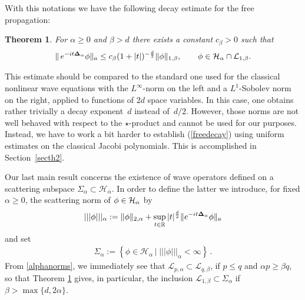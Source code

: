 \documentclass[11pt]{article}
\newtheorem{theorem}{Theorem}
\begin{document}
With this notations we have the following decay estimate for the free
propagation:
\begin{theorem}\label{th2} For $\alpha\geq 0$ and  $\beta > d$ there exists a constant
$c_\beta>0$ such that
\begin{gather}\label{freedecay}
\Vert\, e^{-it{\bf\Delta}_\alpha}\phi \Vert_a  \leq  c_{\beta}(1+
|t|)^{-\frac{d}{2}} \Vert\phi\Vert_{1,\beta} ,
\qquad \phi\in {\cal H}_\alpha\cap {\cal L}_{1,\beta} .
\end{gather}
\end{theorem}

This estimate should be compared to the standard one used for the
classical nonlinear wave equations with the $L^\infty$-norm on the
left and a $L^1$-Sobolev norm on the right, applied to
functions of $2d$ space variables. In this case, one obtains rather
trivially a decay exponent~$d$ instead of~$d/2$. However, those norms
are not well behaved with respect to the $\star$-product and cannot be
used for our purposes. Instead, we have to work a bit harder to establish
(\ref{freedecay}) using uniform estimates on the classical Jacobi
polynomials. This is accomplished in Section~\ref{secth2}.



Our last main result concerns the existence of wave operators
def\/ined on a scattering subspace $\Sigma_\alpha\subset \mathcal H_\alpha$. In order to def\/ine
the latter we introduce, for f\/ixed $\alpha\geq 0$, the scattering norm
of $\phi\in{\cal H}_\alpha$ by
\begin{gather*}%
|||\phi|||_{\alpha}:=
\Vert\phi\Vert_{2,\alpha}+\sup_{t\in\mathbb R} |t|^{\frac d2}
\Vert e^{-it{\bf\Delta}_\alpha}\phi\Vert_a
\end{gather*}
and set
\begin{gather*}
\Sigma_{\alpha}:=\left\{\phi\in\mathcal H_\alpha\,|\;|||\phi|||_{\alpha}<\infty\right\}\,.
\end{gather*}
From \eqref{alphanorms}, we immediately see that
$\mathcal L_{p,\alpha}\subset\mathcal L_{q,\beta}$, if $p\leq q$ and
$\alpha p\geq\beta q$, so that Theorem \ref{th2} gives, in particular, the
inclusion $\mathcal L_{1,\beta}\subset\Sigma_\alpha$ if $\beta> \max\{d, 2\alpha\}$.
\end{document}
